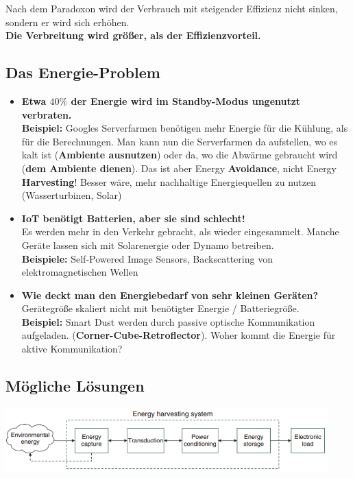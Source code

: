 \documentclass[a4paper]{article}
\begin{document}
Nach dem Paradoxon wird der Verbrauch mit steigender Effizienz nicht sinken, sondern er wird sich erhöhen. \\
\textbf{Die Verbreitung wird größer, als der Effizienzvorteil.}

\subsection{Das Energie-Problem}
\begin{itemize}
	\item \textbf{Etwa $40\%$ der Energie wird im Standby-Modus ungenutzt verbraten.}\\
	\textbf{Beispiel:} Googles Serverfarmen benötigen mehr Energie für die Kühlung, als für die Berechnungen. Man kann nun die Serverfarmen da aufstellen, wo es kalt ist (\textbf{Ambiente ausnutzen}) oder da, wo die Abwärme gebraucht wird (\textbf{dem Ambiente dienen}). Das ist aber Energy \textbf{Avoidance}, nicht Energy \textbf{Harvesting}! Besser wäre, mehr nachhaltige Energiequellen zu nutzen (Wasserturbinen, Solar)\newpage
	\item \textbf{IoT benötigt Batterien, aber sie sind schlecht!}\\ Es werden mehr in den Verkehr gebracht, als wieder eingesammelt. Manche Geräte lassen sich mit Solarenergie oder Dynamo betreiben. \\
	\textbf{Beispiele:} Self-Powered Image Sensors, Backscattering von elektromagnetischen Wellen
	\item \textbf{Wie deckt man den Energiebedarf von sehr kleinen Geräten?}\\
	Gerätegröße skaliert nicht mit benötigter Energie / Batteriegröße.\\
	\textbf{Beispiel:} Smart Dust werden durch passive optische Kommunikation aufgeladen. (\textbf{Corner-Cube-Retroflector}). Woher kommt die Energie für aktive Kommunikation?
\end{itemize}
\subsection{Mögliche Lösungen}
\begin{center}
	\includegraphics[height = 2.5cm]{Harvesting.png}
\end{center}
\end{document}
